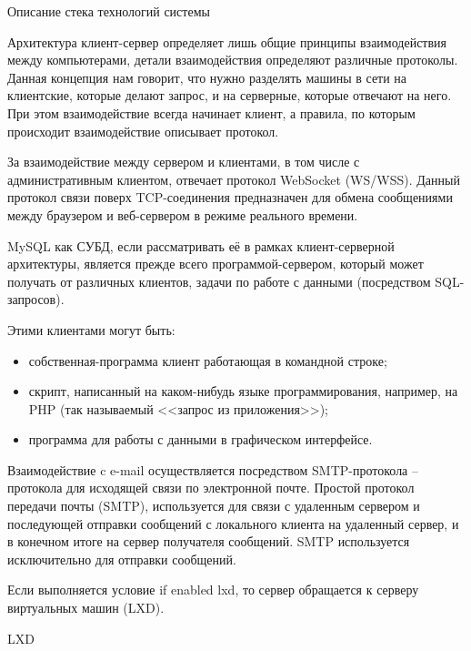 \begin{center}
Описание стека технологий системы
\end{center}

Архитектура клиент-сервер определяет лишь общие принципы взаимодействия между компьютерами, детали взаимодействия определяют различные протоколы. Данная концепция нам говорит, что нужно разделять машины в сети на клиентские, которые делают запрос, и на серверные, которые отвечают на него. При этом взаимодействие всегда начинает клиент, а правила, по которым происходит взаимодействие описывает протокол.\par
За взаимодействие между сервером и клиентами, в том числе с административным клиентом, отвечает протокол WebSocket (WS/WSS). Данный протокол связи поверх TCP-соединения предназначен для обмена сообщениями между браузером и веб-сервером в режиме реального времени.\par
MySQL как СУБД, если рассматривать её в рамках клиент-серверной архитектуры, является прежде всего программой-сервером, который может получать от различных клиентов, задачи по работе с данными (посредством SQL-запросов).\par 
Этими клиентами могут быть:
\begin{itemize}
\item собственная-программа клиент работающая в командной строке;
\item скрипт, написанный на каком-нибудь языке программирования, например, на PHP (так называемый <<запрос из приложения>>);
\item программа для работы с данными в графическом интерфейсе.\par
\end{itemize}
\vspace{\baselineskip}

Взаимодействие c e-mail осуществляется посредством SMTP-протокола -- протокола для исходящей связи по электронной почте. Простой протокол передачи почты (SMTP), используется для связи с удаленным сервером и последующей отправки сообщений с локального клиента на удаленный сервер, и в конечном итоге на сервер получателя сообщений. SMTP используется исключительно для отправки сообщений.\par
Если выполняется условие if enabled lxd, то сервер обращается к серверу виртуальных машин (LXD).\par
\vspace{\baselineskip}

\begin{center}
LXD
\end{center}

